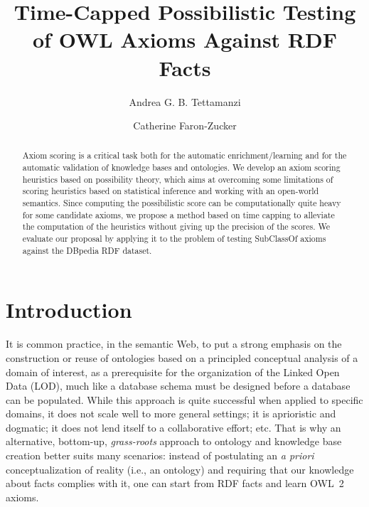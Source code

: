 \documentclass{llncs}
\begin{document}
\title{Time-Capped Possibilistic Testing of OWL Axioms Against RDF Facts}


\author{Andrea G. B. Tettamanzi \and Catherine Faron-Zucker}




\maketitle

\begin{abstract}
Axiom scoring is a critical task both for the automatic enrichment/learning
and for the automatic validation of knowledge bases and ontologies.
We develop an axiom scoring heuristics based on possibility theory,
which aims at overcoming some limitations of scoring heuristics based on statistical inference
and working with an open-world semantics.
Since computing the possibilistic score can be computationally quite heavy
for some candidate axioms, we propose a method based on time capping
to alleviate the computation of the heuristics without giving up the precision of the scores.
We evaluate our proposal by applying it to the problem of testing \textsf{SubClassOf}
axioms against the DBpedia RDF dataset.
\end{abstract}


\section{Introduction}

It is common practice, in the semantic Web, to put a strong emphasis
on the construction or reuse of ontologies based on a principled conceptual analysis
of a domain of interest, as a prerequisite for the organization of the Linked Open Data (LOD),
much like a database schema must be designed before a database can be populated.
While this approach is quite successful when applied to specific domains,
it does not scale well to more general settings;
it is aprioristic and dogmatic;
it does not lend itself to a collaborative effort; etc.
That is why an alternative, bottom-up, \emph{grass-roots} approach to ontology and
knowledge base creation better suits many scenarios: instead of postulating an \emph{a priori}
conceptualization of reality (i.e., an ontology) and requiring that our knowledge
about facts complies with it, one can start from RDF facts and learn OWL~2 axioms.
\end{document}
